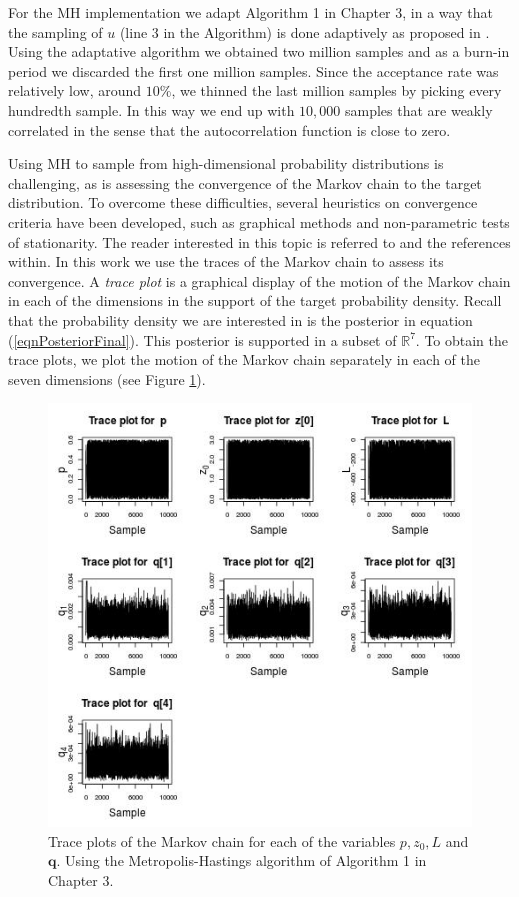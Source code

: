 \documentclass{sfuthesis}
\newcommand{\q}{\textbf{q}}
\newcommand{\pars}{p,z_{0},L}
\begin{document}
For the MH implementation we adapt Algorithm 1 in Chapter 3, in a way
that the sampling of $u$ (line 3 in the Algorithm) is done adaptively as proposed in \cite{roberts2009examples}.
Using the adaptative algorithm we obtained two million samples and  as a burn-in period we discarded the first one million  samples. 
Since the acceptance rate was relatively low, around $10\%$, we thinned the last million samples
by picking every hundredth sample. In this way we end up with $10,000$ samples that are
weakly correlated in the sense that the autocorrelation function is close to zero.


Using MH to sample
from high-dimensional probability distributions is challenging, as is assessing the convergence of the Markov chain
to the target distribution.
 To overcome these difficulties, several heuristics on convergence
criteria have been developed, such as graphical methods and non-parametric tests of stationarity. The reader
interested in this topic is referred to \cite{casella2008monte} and the references within. 
In this work we use the traces of the Markov chain to assess its convergence. 
A \textit{trace plot} is a graphical display of the motion of the Markov chain in each
of the dimensions in the support of the target probability density. 
Recall that the probability density we are interested in is the  posterior in equation (\ref{eqnPosteriorFinal}). 
This posterior is supported in a  subset of $\mathbb{R}^{7}$. To obtain the trace plots,
we  plot the motion of the Markov chain separately in each of the seven dimensions (see Figure \ref{figTraces}). 
\begin{figure}[H]
\centering
\includegraphics[scale=0.75]{./FigChap4/traces}
\caption{Trace plots of the Markov chain for each of the  variables $\pars$ and $\q$. Using
the Metropolis-Hastings algorithm of Algorithm 1 in Chapter 3.}
\label{figTraces}
\end{figure}
\end{document}
